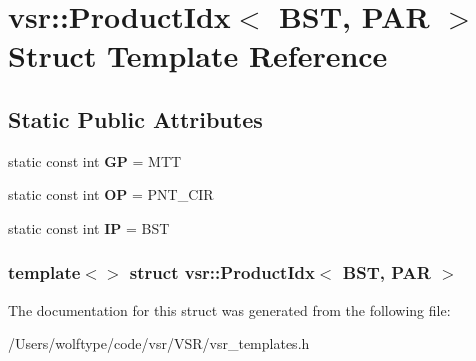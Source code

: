 \hypertarget{structvsr_1_1_product_idx_3_01_b_s_t_00_01_p_a_r_01_4}{\section{vsr\-:\-:Product\-Idx$<$ B\-S\-T, P\-A\-R $>$ Struct Template Reference}
\label{structvsr_1_1_product_idx_3_01_b_s_t_00_01_p_a_r_01_4}
}
\subsection*{Static Public Attributes}
\begin{DoxyCompactItemize}
\item 
\hypertarget{structvsr_1_1_product_idx_3_01_b_s_t_00_01_p_a_r_01_4_ab23730af1db4529e0e28df10a4522824}{static const int {\bfseries G\-P} = M\-T\-T}\label{structvsr_1_1_product_idx_3_01_b_s_t_00_01_p_a_r_01_4_ab23730af1db4529e0e28df10a4522824}

\item 
\hypertarget{structvsr_1_1_product_idx_3_01_b_s_t_00_01_p_a_r_01_4_addba7cca9aef357734e4b450ebc40b44}{static const int {\bfseries O\-P} = P\-N\-T\-\_\-\-C\-I\-R}\label{structvsr_1_1_product_idx_3_01_b_s_t_00_01_p_a_r_01_4_addba7cca9aef357734e4b450ebc40b44}

\item 
\hypertarget{structvsr_1_1_product_idx_3_01_b_s_t_00_01_p_a_r_01_4_a7d6c49b7546cbdfe8f001da818e8a841}{static const int {\bfseries I\-P} = B\-S\-T}\label{structvsr_1_1_product_idx_3_01_b_s_t_00_01_p_a_r_01_4_a7d6c49b7546cbdfe8f001da818e8a841}

\end{DoxyCompactItemize}
\subsubsection*{template$<$$>$ struct vsr\-::\-Product\-Idx$<$ B\-S\-T, P\-A\-R $>$}



The documentation for this struct was generated from the following file\-:\begin{DoxyCompactItemize}
\item 
/\-Users/wolftype/code/vsr/\-V\-S\-R/vsr\-\_\-templates.\-h\end{DoxyCompactItemize}
